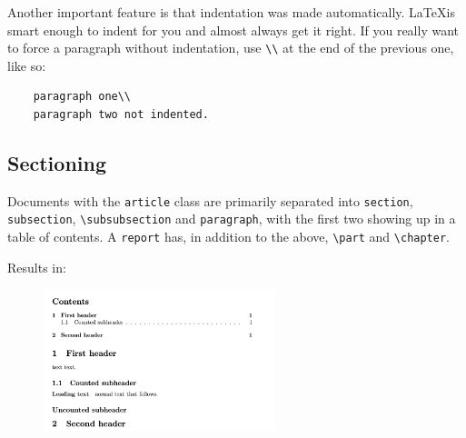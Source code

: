 Another important feature is that indentation was made automatically.
\LaTeX is smart enough to indent for you and almost always get it right.
If you really want to force a paragraph without indentation, use \verb|\\| at the end of the previous one, like so:
\begin{lstlisting}
    paragraph one\\
    paragraph two not indented.
\end{lstlisting}

\subsection{Sectioning}
Documents with the \texttt{article} class are primarily separated into \verb|section|, \verb|subsection|, \verb|\subsubsection| and \verb|paragraph|, with the first two showing up in a table of contents.
A \texttt{report} has, in addition to the above, \verb|\part| and \verb|\chapter|.



Results in: \clearpage
\begin{figure}[h]
    \centering
    \includegraphics[width=0.6\textwidth]{figures/sections.png}
    \label{fig:sections}
\end{figure}

